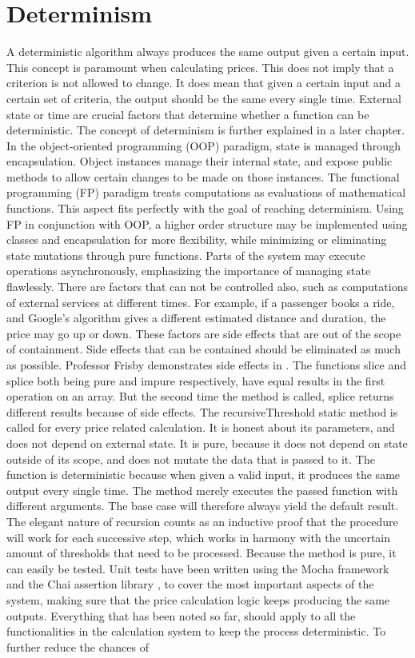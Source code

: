 \section{Determinism}
A deterministic algorithm always produces the same output given a certain input. This concept is paramount when calculating prices. This does not imply that a criterion is not allowed to change. It does mean that given a certain input and a certain set of criteria, the output should be the same every single time. External state or time are crucial factors that determine whether a function can be deterministic. The concept of determinism is further explained in a later chapter. In the object-oriented programming (OOP) paradigm, state is managed through encapsulation. Object instances manage their internal state, and expose public methods to allow certain changes to be made on those instances. The functional programming (FP) paradigm treats computations as evaluations of mathematical functions. This aspect fits perfectly with the goal of reaching determinism. Using FP in conjunction with OOP, a higher order structure may be implemented using classes and encapsulation for more flexibility, while minimizing or eliminating state mutations through pure functions. Parts of the system may execute operations asynchronously, emphasizing the importance of managing state flawlessly. There are factors that can not be controlled also, such as computations of external services at different times. For example, if a passenger books a ride, and Google's algorithm gives a different estimated distance and duration, the price may go up or down. These factors are side effects that are out of the scope of containment. Side effects that can be contained should be eliminated as much as possible. Professor Frisby demonstrates side effects in \cite[Chapter~3]{Frisby}. The functions slice and splice both being pure and impure respectively, have equal results in the first operation on an array. But the second time the method is called, splice returns different results because of side effects. The recursiveThreshold static method is called for every price related calculation. It is honest about its parameters, and does not depend on external state. It is pure, because it does not depend on state outside of its scope, and does not mutate the data that is passed to it. The function is deterministic because when given a valid input, it produces the same output every single time. The method merely executes the passed function with different arguments. The base case will therefore always yield the default result. The elegant nature of recursion counts as an inductive proof that the procedure will work for each successive step, which works in harmony with the uncertain amount of thresholds that need to be processed. Because the method is pure, it can easily be tested. Unit tests have been written using the Mocha framework \cite{mocha} and the Chai assertion library \cite{chai}, to cover the most important aspects of the system, making sure that the price calculation logic keeps producing the same outputs. Everything that has been noted so far, should apply to all the functionalities in the calculation system to keep the process deterministic. To further reduce the chances of 